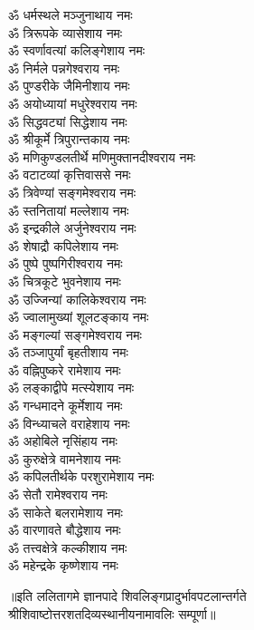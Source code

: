 \begin{multicols}{2}
\begin{flushleft}
ॐ धर्मस्थले मञ्जुनाथाय नमः\\
ॐ त्रिरूपके व्यासेशाय नमः\hfill{}\\
ॐ स्वर्णावत्यां कलिङ्गेशाय नमः\\
ॐ निर्मले पन्नगेश्वराय नमः\\
ॐ पुण्डरीके जैमिनीशाय नमः\\
ॐ अयोध्यायां मधुरेश्वराय नमः\\
ॐ सिद्धवट्यां सिद्धेशाय नमः\\
ॐ श्रीकूर्मे त्रिपुरान्तकाय नमः\\
ॐ मणिकुण्डलतीर्थे मणिमुक्तानदीश्वराय नमः\\
ॐ वटाटव्यां कृत्तिवाससे नमः\\
ॐ त्रिवेण्यां सङ्गमेश्वराय नमः\\
ॐ स्तनितायां मल्लेशाय नमः\hfill{}\\
ॐ इन्द्रकीले अर्जुनेश्वराय नमः\\
ॐ शेषाद्रौ कपिलेशाय नमः\\
ॐ पुष्पे पुष्पगिरीश्वराय नमः\\
ॐ चित्रकूटे भुवनेशाय नमः\\
ॐ उज्जिन्यां कालिकेश्वराय नमः\\
ॐ ज्वालामुख्यां शूलटङ्काय नमः\\
ॐ मङ्गल्यां सङ्गमेश्वराय नमः\\
ॐ तञ्जापुर्यां बृहतीशाय नमः\\
ॐ वह्निपुष्करे रामेशाय नमः\\
ॐ लङ्काद्वीपे मत्स्येशाय नमः\hfill{}\\
ॐ गन्धमादने कूर्मेशाय नमः\\
ॐ विन्ध्याचले वराहेशाय नमः\\
ॐ अहोबिले नृसिंहाय नमः\\
ॐ कुरुक्षेत्रे वामनेशाय नमः\\
ॐ कपिलतीर्थके परशुरामेशाय नमः\\
ॐ सेतौ रामेश्वराय नमः\\
ॐ साकेते बलरामेशाय नमः\\
ॐ वारणावते बौद्धेशाय नमः\\
ॐ तत्त्वक्षेत्रे कल्कीशाय नमः\\
ॐ महेन्द्रके कृष्णेशाय नमः\hfill{}\\
\end{flushleft}
\end{multicols}
\centering
॥इति ललितागमे ज्ञानपादे शिवलिङ्गप्रादुर्भावपटलान्तर्गते\\
 श्रीशिवाष्टोत्तरशतदिव्यस्थानीयनामावलिः सम्पूर्णा॥

